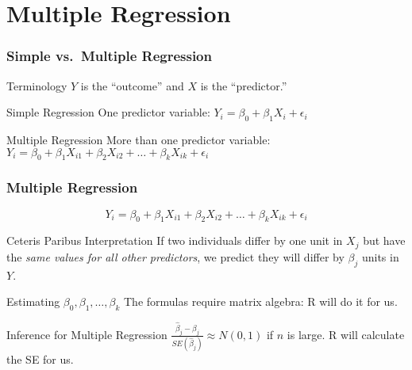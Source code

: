 \section{Multiple Regression}
\begin{frame}
\frametitle{Simple vs.\ Multiple Regression}
\begin{block}{Terminology}
$Y$ is the ``outcome'' and $X$ is the ``predictor.''
\end{block}

\begin{block}{Simple Regression}
One predictor variable: $Y_i = \beta_0 + \beta_1 X_i + \epsilon_i$
\end{block}
\begin{block}{Multiple Regression}
More than one predictor variable: $Y_i = \beta_0 + \beta_1 X_{i1} + \beta_2 X_{i2} +  \hdots + \beta_k X_{ik} + \epsilon_i$
\end{block}



\end{frame}


\begin{frame}
\frametitle{Multiple Regression}
$$Y_i = \beta_0 + \beta_1 X_{i1} + \beta_2 X_{i2} +  \hdots + \beta_k X_{ik} + \epsilon_i$$

\begin{block}{Ceteris Paribus Interpretation}
  If two individuals differ by one unit in $X_j$ but have the \emph{same values for all other predictors}, we predict they will differ by $\beta_j$ units in $Y$.
\end{block}

\begin{block}{Estimating $\beta_0, \beta_1, \dots, \beta_k$}
  The formulas require matrix algebra: R will do it for us.
\end{block}

\begin{block}{Inference for Multiple Regression}
$\displaystyle\frac{\widehat{\beta}_j - \beta_j}{\widehat{SE}(\widehat{\beta}_j)} \approx N(0,1)$ if $n$ is large. 
R will calculate the SE for us.
\end{block}

\end{frame}

